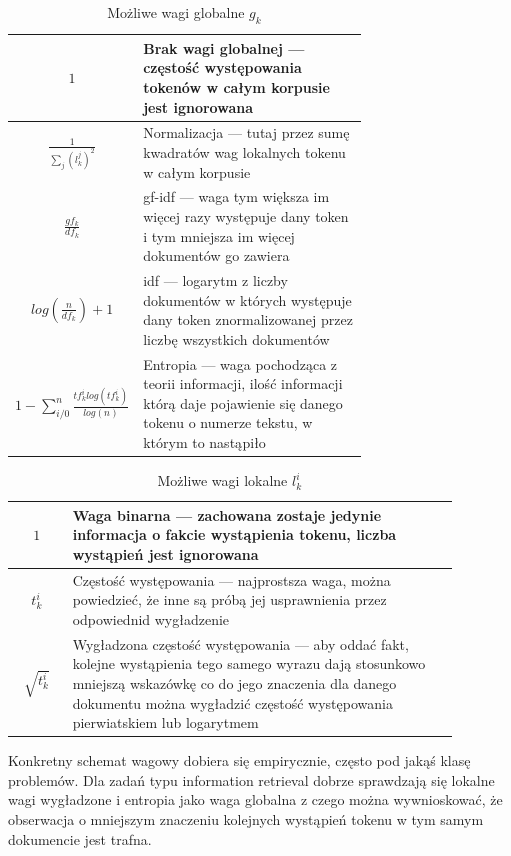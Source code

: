 \documentclass[11pt,a4paper]{article}
\begin{document}
\begin{table}[h]
\caption{Możliwe wagi globalne $g_k$}
\label{global-weights}
\begin{tabular}[c]{|c|p{0.7\linewidth}|}
\hline
$1$ & Brak wagi globalnej --- częstość występowania tokenów w całym korpusie jest ignorowana \\\hline
$\frac{1}{\sum_j (l^j_k)^2}$ & Normalizacja --- tutaj przez sumę kwadratów wag lokalnych tokenu w całym korpusie\\\hline
$\frac{gf_k}{df_k}$ & gf-idf --- waga tym większa im więcej razy występuje dany token i tym mniejsza im więcej dokumentów go zawiera\\\hline
$log(\frac{n}{df_k}) + 1$ & idf --- logarytm z liczby dokumentów w których występuje dany token znormalizowanej przez liczbę wszystkich dokumentów\\\hline
$1 - \sum_{i/0}^n \frac{tf^i_klog(tf^i_k)}{log(n)}$ & Entropia --- waga pochodząca z teorii informacji, ilość informacji którą daje pojawienie się danego tokenu o numerze tekstu, w którym to nastąpiło\\\hline
\end{tabular}
\end{table}

\begin{table}[h]
\caption{Możliwe wagi lokalne $l^i_k$}
\label{local-weights}
\begin{tabular}[c]{|c|p{0.875\linewidth}|}
\hline
$1$ & Waga binarna --- zachowana zostaje jedynie informacja o fakcie wystąpienia tokenu, liczba wystąpień jest ignorowana\\\hline
$t^i_k$ & Częstość występowania --- najprostsza waga, można powiedzieć, że inne są próbą jej usprawnienia przez odpowiednid wygładzenie\\\hline
$\sqrt{t^i_k}$ & Wygładzona częstość występowania --- aby oddać fakt, kolejne wystąpienia tego samego wyrazu dają stosunkowo mniejszą wskazówkę co do jego znaczenia dla danego dokumentu można wygładzić częstość występowania pierwiatskiem lub logarytmem\\\hline
\end{tabular}
\end{table}

Konkretny schemat wagowy dobiera się empirycznie, często pod jakąś klasę
problemów. Dla zadań typu information retrieval dobrze sprawdzają się lokalne
wagi wygładzone i entropia jako waga globalna z czego można wywnioskować, że
obserwacja o mniejszym znaczeniu kolejnych wystąpień tokenu w tym samym
dokumencie jest trafna.
\end{document}
